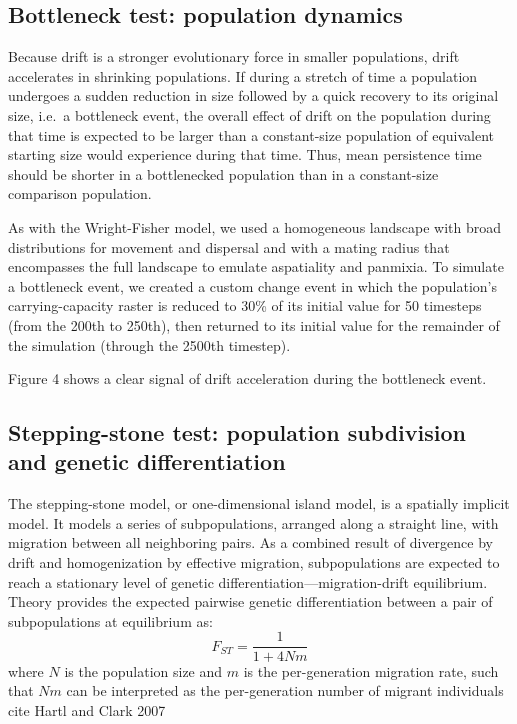 ﻿\documentclass{article}
\begin{document}
\subsection{Bottleneck test: population dynamics}
Because drift is a stronger evolutionary force in smaller populations,
drift accelerates in shrinking populations. 
If during a stretch of time a population undergoes a sudden reduction in size followed by a quick recovery to
its original size, i.e.\ a bottleneck event, the overall effect of drift on the population
during that time is expected to be larger than a constant-size population of equivalent
starting size would experience during that time. 
Thus, mean persistence time should be shorter in a bottlenecked population than
in a constant-size comparison population.

As with the Wright-Fisher model, we used a homogeneous landscape with broad distributions
for movement and dispersal and with a mating radius that encompasses the full landscape
to emulate aspatiality and panmixia. To simulate a bottleneck event,
we created a custom change event in which the population's carrying-capacity raster
is reduced to 30\% of its initial value for 50 timesteps (from the 200th to 250th),
then returned to its initial value for the remainder of the simulation
(through the 2500th timestep).

Figure 4 shows a clear signal of drift acceleration during the bottleneck event.


\subsection{Stepping-stone test: population subdivision and genetic differentiation}
The stepping-stone model, or one-dimensional island model, is a spatially implicit model.
It models a series of subpopulations, arranged along a straight line,
with migration between all neighboring pairs.
As a combined result of divergence by drift and homogenization
by effective migration, subpopulations are expected to reach
a stationary level of genetic differentiation---migration-drift equilibrium. 
Theory provides the expected pairwise genetic differentiation
between a pair of subpopulations at equilibrium as:
\begin{equation}
F_{ST} = \frac{1}{1 + 4Nm}
\end{equation}
where $N$ is the population size and $m$ is the per-generation migration rate,
such that $Nm$ can be interpreted as the per-generation number of migrant
individuals {\large cite  Hartl and Clark 2007}
\end{document}
